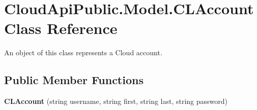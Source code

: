 \hypertarget{class_cloud_api_public_1_1_model_1_1_c_l_account}{\section{Cloud\-Api\-Public.\-Model.\-C\-L\-Account Class Reference}
\label{class_cloud_api_public_1_1_model_1_1_c_l_account}
}


An object of this class represents a Cloud account.  


\subsection*{Public Member Functions}
\begin{DoxyCompactItemize}
\item 
\hypertarget{class_cloud_api_public_1_1_model_1_1_c_l_account_aea02bed9e42bf00bdf01bbe47266d6ba}{{\bfseries C\-L\-Account} (string username, string first, string last, string password)}\label{class_cloud_api_public_1_1_model_1_1_c_l_account_aea02bed9e42bf00bdf01bbe47266d6ba}

\end{DoxyCompactItemize}
